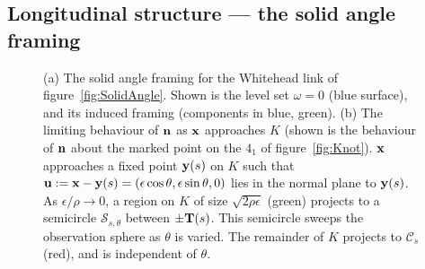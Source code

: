     \subsection{Longitudinal structure --- the solid angle framing}
    \begin{figure}[t]
        \caption{(a) The solid angle framing for the Whitehead link of figure~\ref{fig:SolidAngle}. Shown is the level set $\omega =0$ (blue surface), and its induced framing (components in blue, green). (b) The limiting behaviour of $\bf n$ as $\bf x$ approaches $K$ (shown is the behaviour of $\bf n$ about the marked point on the $4_1$ of figure~\ref{fig:Knot}). $\bf x$ approaches a fixed point ${\bf y}(s)$ on $K$ such that ${\bf u} := {\bf x} - {\bf y}(s) = (\epsilon \cos\theta, \epsilon \sin\theta,0)$ lies in the normal plane to ${\bf y} (s)$. As $\epsilon/\rho \rightarrow 0$, a region on $K$ of size $\sqrt{ 2 \rho \epsilon}$ (green) projects to a semicircle $\mathcal{S}_{s,\theta}$ between $\pm{\bf T}(s)$. This semicircle sweeps the observation sphere as $\theta$ is varied. The remainder of $K$ projects to $\mathcal{C}_s$ (red), and is independent of $\theta$.} 
        \label{fig:LocalStructure}
    \end{figure}

